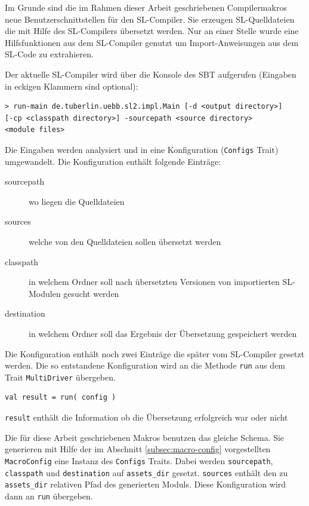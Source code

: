 \documentclass[12pt,bibtotoc]{scrreprt}
\begin{document}
Im Grunde sind die im Rahmen dieser Arbeit geschriebenen Compilermakros neue Benutzerschnittstellen für den SL-Compiler. Sie erzeugen SL-Quelldateien die mit Hilfe des SL-Compilers übersetzt werden. Nur an einer Stelle wurde eine Hilfsfunktionen aus dem SL-Compiler genutzt um Import-Anweisungen aus dem SL-Code zu extrahieren.

Der aktuelle SL-Compiler wird über die Konsole des \ac{SBT} aufgerufen (Eingaben in eckigen Klammern sind optional)\cite{TypeSave}\cite[S. 15f]{Bisping2013}:

\begin{lstlisting}
> run-main de.tuberlin.uebb.sl2.impl.Main [-d <output directory>]
[-cp <classpath directory>] -sourcepath <source directory>
<module files>
\end{lstlisting}

Die Eingaben werden analysiert und in eine Konfiguration (\lstinline!Configs! Trait) umgewandelt. Die Konfiguration enthält folgende Einträge:

\begin{description}
 \item[sourcepath]{wo liegen die Quelldateien}
 \item[sources]{welche von den Quelldateien sollen übersetzt werden}
 \item[classpath]{in welchem Ordner soll nach übersetzten Versionen von importierten SL-Modulen gesucht werden}
 \item[destination]{in welchem Ordner soll das Ergebnis der Übersetzung gespeichert werden}
\end{description}

Die Konfiguration enthält noch zwei Einträge die später vom SL-Compiler gesetzt werden. Die so entstandene Konfiguration wird an die Methode \lstinline!run! aus dem Trait \lstinline!MultiDriver! \cite[S. 16-19]{Bisping2013} übergeben.

\begin{lstlisting}
val result = run( config )
\end{lstlisting}

\lstinline!result! enthält die Information ob die Übersetzung erfolgreich war oder nicht

Die für diese Arbeit geschriebenen Makros benutzen das gleiche Schema. Sie generieren mit Hilfe der im Abschnitt \ref{subsec:macro-config} vorgestellten \lstinline!MacroConfig! eine Instanz des \lstinline!Configs! Traits. Dabei werden \lstinline!sourcepath!, \lstinline!classpath! und \lstinline!destination! auf \lstinline!assets_dir! gesetzt. \lstinline!sources! enthält den zu \lstinline!assets_dir! relativen Pfad des generierten Moduls. Diese Konfiguration wird dann an \lstinline!run! übergeben.
\end{document}
